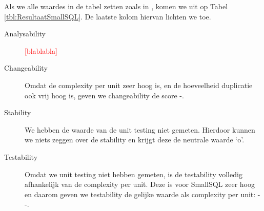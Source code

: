 \documentclass[a4paper]{article}
\newcommand{\todo}[1]{\textcolor{red}{[#1]}}
\begin{document}
Als we alle waardes in de tabel zetten zoals in \cite{A}, komen we uit op Tabel \ref{tbl:ResultaatSmallSQL}. De laatste kolom hiervan lichten we toe.
\begin{description}
\item[Analysability] \todo{blablabla}
\item[Changeability] Omdat de complexity per unit zeer hoog is, en de hoeveelheid duplicatie ook vrij hoog is, geven we changeability de score -.
\item[Stability] We hebben de waarde van de unit testing niet gemeten. Hierdoor kunnen we niets zeggen over de stability en krijgt deze de neutrale waarde `o'.
\item[Testability] Omdat we unit testing niet hebben gemeten, is de testability volledig afhankelijk van de complexity per unit. Deze is voor SmallSQL zeer hoog en daarom geven we testability de gelijke waarde als complexity per unit: - -.
\end{description}
\end{document}
